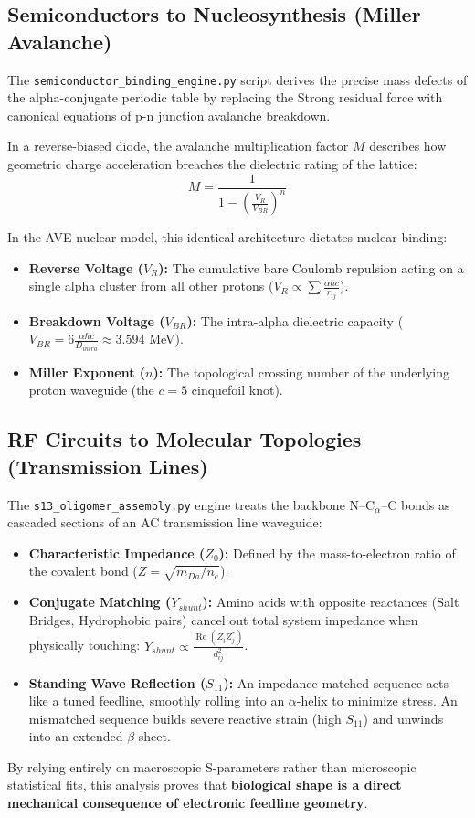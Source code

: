 \subsection{Semiconductors to Nucleosynthesis (Miller Avalanche)}
\label{sec:ee_semiconductor_nuclear}

The \texttt{semiconductor\_binding\_engine.py} script derives the precise mass defects of the alpha-conjugate periodic table by replacing the Strong residual force with canonical equations of p-n junction avalanche breakdown.

In a reverse-biased diode, the avalanche multiplication factor $M$ describes how geometric charge acceleration breaches the dielectric rating of the lattice:
\begin{equation}
    M = \frac{1}{1 - \left(\frac{V_R}{V_{BR}}\right)^n}
\end{equation}

In the AVE nuclear model, this identical architecture dictates nuclear binding:
\begin{itemize}
    \item \textbf{Reverse Voltage ($V_R$):} The cumulative bare Coulomb repulsion acting on a single alpha cluster from all other protons ($V_R \propto \sum \frac{\alpha\hbar c}{r_{ij}}$).
    \item \textbf{Breakdown Voltage ($V_{BR}$):} The intra-alpha dielectric capacity ($V_{BR} = 6 \frac{\alpha\hbar c}{D_{intra}} \approx 3.594$ MeV).
    \item \textbf{Miller Exponent ($n$):} The topological crossing number of the underlying proton waveguide (the $c = 5$ cinquefoil knot).
\end{itemize}

\subsection{RF Circuits to Molecular Topologies (Transmission Lines)}
\label{sec:ee_rf_proteins}

The \texttt{s13\_oligomer\_assembly.py} engine treats the backbone N--C$_\alpha$--C bonds as cascaded sections of an AC transmission line waveguide:
\begin{itemize}
    \item \textbf{Characteristic Impedance ($Z_0$):} Defined by the mass-to-electron ratio of the covalent bond ($Z = \sqrt{m_{Da}/n_e}$).
    \item \textbf{Conjugate Matching ($Y_{shunt}$):} Amino acids with opposite reactances (Salt Bridges, Hydrophobic pairs) cancel out total system impedance when physically touching: $Y_{shunt} \propto \frac{\operatorname{Re}(Z_i Z_j^*)}{d_{ij}^2}$.
    \item \textbf{Standing Wave Reflection ($S_{11}$):} An impedance-matched sequence acts like a tuned feedline, smoothly rolling into an $\alpha$-helix to minimize stress. An mismatched sequence builds severe reactive strain (high $S_{11}$) and unwinds into an extended $\beta$-sheet.
\end{itemize}

By relying entirely on macroscopic S-parameters rather than microscopic statistical fits, this analysis proves that \textbf{biological shape is a direct mechanical consequence of electronic feedline geometry}.
